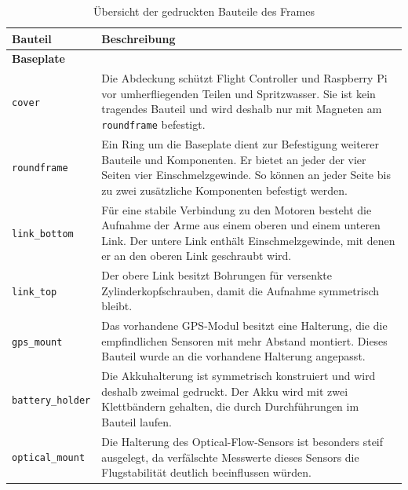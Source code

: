     \begin{table}[H]
        \centering
        \caption{Übersicht der gedruckten Bauteile des Frames}
        \label{tab:Bauteile}
        \renewcommand{\tabularxcolumn}[1]{p{#1}} %
        \newcommand{\bauteilrule}{\arrayrulecolor{black!30}\specialrule{0.4pt}{2pt}{2pt}\arrayrulecolor{black}} %
        \begin{tabularx}{\textwidth}{l X}
            \toprule
            \textbf{Bauteil} & \textbf{Beschreibung} \\
            \midrule
            \multicolumn{2}{l}{\textbf{Baseplate}} \\
            \texttt{cover} & Die Abdeckung schützt Flight Controller und Raspberry Pi vor umherfliegenden Teilen und Spritzwasser. Sie ist kein tragendes Bauteil und wird deshalb nur mit Magneten am \texttt{roundframe} befestigt.\\
            \bauteilrule
            \texttt{roundframe} & Ein Ring um die Baseplate dient zur Befestigung weiterer Bauteile und Komponenten. Er bietet an jeder der vier Seiten vier Einschmelzgewinde. So können an jeder Seite bis zu zwei zusätzliche Komponenten befestigt werden.\\
            \bauteilrule
            \texttt{link\_bottom} & Für eine stabile Verbindung zu den Motoren besteht die Aufnahme der Arme aus einem oberen und einem unteren Link. Der untere Link enthält Einschmelzgewinde, mit denen er an den oberen Link geschraubt wird.\\
            \bauteilrule
            \texttt{link\_top} & Der obere Link besitzt Bohrungen für versenkte Zylinderkopfschrauben, damit die Aufnahme symmetrisch bleibt.\\
            \bauteilrule
            \texttt{gps\_mount} & Das vorhandene GPS-Modul besitzt eine Halterung, die die empfindlichen Sensoren mit mehr Abstand montiert. Dieses Bauteil wurde an die vorhandene Halterung angepasst.\\
            \bauteilrule
            \texttt{battery\_holder} & Die Akkuhalterung ist symmetrisch konstruiert und wird deshalb zweimal gedruckt. Der Akku wird mit zwei Klettbändern gehalten, die durch Durchführungen im Bauteil laufen.\\
            \bauteilrule
            \texttt{optical\_mount} & Die Halterung des Optical-Flow-Sensors ist besonders steif ausgelegt, da verfälschte Messwerte dieses Sensors die Flugstabilität deutlich beeinflussen würden.\\

\end{tabularx}
\end{table}
